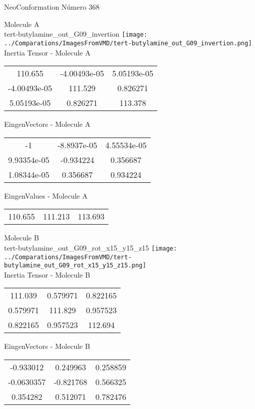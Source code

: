\vtab[-2cm]
\begin{center}
{\large NeoConformation \tab Número 368}
\end{center}
\begin{multicols}{2}
\begin{center}

Molecule A \\ 
tert-butylamine\_out\_G09\_invertion
\texttt{[image: ../Comparations/ImagesFromVMD/tert-butylamine\_out\_G09\_invertion.png]}
\\
Inertia Tensor - Molecule A \\
\vtab

\begin{tabular}{|c c c|}
110.655	 & 	-4.00493e-05	 & 	5.05193e-05	 \\
-4.00493e-05	 & 	111.529	 & 	0.826271	 \\
5.05193e-05	 & 	0.826271	 & 	113.378
\end{tabular}

\vtab
 EingenVectors - Molecule A     \\
\vtab
\begin{tabular}{|c c c|}
-1	 & 	-8.8937e-05	 & 	4.55534e-05	 \\
9.93354e-05	 & 	-0.934224	 & 	0.356687	 \\
1.08344e-05	 & 	0.356687	 & 	0.934224
\end{tabular}

\vtab
 EingenValues - Molecule A     \\
\vtab
\begin{tabular}{|c c c|}
110.655	 & 	111.213	 & 	113.693	 \\
\end{tabular}
\columnbreak

Molecule B \\ 
tert-butylamine\_out\_G09\_rot\_x15\_y15\_z15
\texttt{[image: ../Comparations/ImagesFromVMD/tert-butylamine\_out\_G09\_rot\_x15\_y15\_z15.png]}
\\
Inertia Tensor - Molecule B \\
\vtab

\begin{tabular}{|c c c|}
111.039	 & 	0.579971	 & 	0.822165	 \\
0.579971	 & 	111.829	 & 	0.957523	 \\
0.822165	 & 	0.957523	 & 	112.694
\end{tabular}

\vtab
 EingenVectors - Molecule B     \\
\vtab
\begin{tabular}{|c c c|}
-0.933012	 & 	0.249963	 & 	0.258859	 \\
-0.0630357	 & 	-0.821768	 & 	0.566325	 \\
0.354282	 & 	0.512071	 & 	0.782476
\end{tabular}


\end{center}
\end{multicols}
